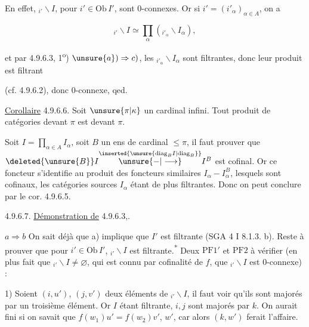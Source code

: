 En effet,    $ {}_{i'}\backslash I$, pour $i'\in\mathrm{Ob}\,I'$, sont $0$-connexes. Or si $i'=(i'_\alpha)_{\alpha\in A}$, on a

\[ {}_{i'}\backslash I\simeq\prod_\alpha({}_{i'_\alpha}\backslash I_\alpha),\]

et par 4.9.6.3, 1\textsuperscript{o}) $\unsure{a})\Rightarrow c)$, les $ {}_{i'_\alpha}\backslash I_\alpha$ sont filtrantes, donc leur produit est filtrant


(cf. 4.9.6.2), donc $0$-connexe, qed.

\uline{Corollaire} 4.9.6.6. Soit $\unsure{\pi|\kappa}$ un cardinal infini. Tout produit de catégories  devant $\pi$ est  devant $\pi$.

Soit $I=\prod_{\alpha\in A}I_\alpha$, soit $B$ un ens de cardinal $\leq\pi$, il faut prouver que $\deleted{\unsure{B}}I\overset{\inserted{\unsure{\mathrm{diag}_B I|\mathrm{diag}_B}}}{\unsure{\mathbin{-}|\longrightarrow}} I^B$ est cofinal. Or ce foncteur s'identifie au produit des foncteurs similaires $I_\alpha\mathbin{-} I_\alpha^B$, lesquels sont cofinaux, les catégories sources $I_\alpha$ étant de plus filtrantes. Donc on peut conclure par le cor. 4.9.6.5.

4.9.6.7. \uline{Démonstration de} 4.9.6.3,. 

$a\Rightarrow b$ \quad On sait déjà que a) implique que $I'$ est filtrante (SGA 4 I 8.1.3. b). Reste à prouver que pour  $i'\in\mathrm{Ob}\,I'$, $ {}_{i'}\backslash I$ est filtrante.\textsuperscript{*} Deux  $\mathrm{PF}1'$ et $\mathrm{PF}2$ à vérifier (en plus  fait que  $ {}_{i'}\backslash I\ne\varnothing$, qui est connu par cofinalité de $f$,  que $ {}_{i'}\backslash I$ est $0$-connexe) :


1) Soient $(i,u')$, $(j,v')$ deux éléments de $ {}_{i'}\backslash I$, il faut voir qu'ils sont majorés par un troisième élément. Or $I$ étant filtrante, $i,j$ sont majorés par $k$. On aurait fini si on savait que $f(w_1)u'=f(w_2)v'$,  $w'$, car alors $(k,w')$ ferait l'affaire.

